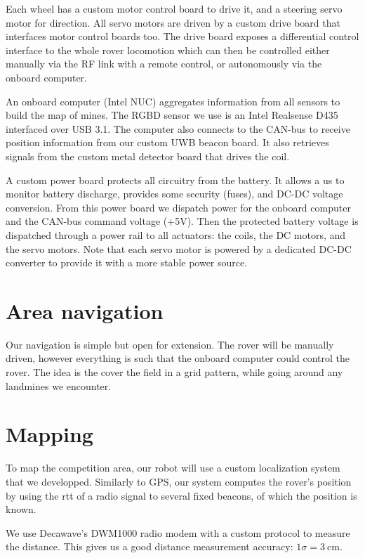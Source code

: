 Each wheel has a custom motor control board to drive it, and a steering servo motor for direction.
All servo motors are driven by a custom drive board that interfaces motor control boards too.
The drive board exposes a differential control interface to the whole rover locomotion which can then be controlled either manually via the RF link with a remote control, or autonomously via the onboard computer.

An onboard computer (Intel NUC) aggregates information from all sensors to build the map of mines.
The RGBD sensor we use is an Intel Realsense D435 interfaced over USB 3.1.
The computer also connects to the CAN-bus to receive position information from our custom UWB beacon board.
It also retrieves signals from the custom metal detector board that drives the coil.

A custom power board protects all circuitry from the battery.
It allows a us to monitor battery discharge, provides some security (fuses), and DC-DC voltage conversion.
From this power board we dispatch power for the onboard computer and the CAN-bus command voltage (+5V).
Then the protected battery voltage is dispatched through a power rail to all actuators: the coils, the DC motors, and the servo motors.
Note that each servo motor is powered by a dedicated DC-DC converter to provide it with a more stable power source.


\section{Area navigation}
Our navigation is simple but open for extension.
The rover will be manually driven, however everything is such that the onboard computer could control the rover.
The idea is the cover the field in a grid pattern, while going around any landmines we encounter.

\section{Mapping}

To map the competition area, our robot will use a custom localization system that we developped.
Similarly to GPS, our system computes the rover's position by using the \gls{rtt} of a radio signal to several fixed beacons, of which the position is known.

We use Decawave's DWM1000 radio modem with a custom protocol to measure the distance.
This gives us a good distance measurement accuracy: $1 \sigma = \SI{3}{\centi\meter}$.

